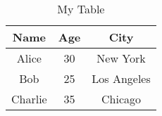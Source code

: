 \documentclass{article}
\begin{document}
\begin{table}[H]
\centering
\begin{tabular}{|c|c|c|}
\hline
Name & Age & City \\
\hline
Alice & 30 & New York \\
\hline
Bob & 25 & Los Angeles \\
\hline
Charlie & 35 & Chicago \\
\hline
\end{tabular}
\caption{My Table}
\label{tab:mytable}
\end{table}
\end{document}
